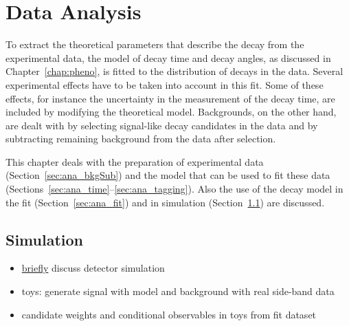 \chapter{Data Analysis}
\label{chap:ana}


To extract the theoretical parameters that describe the \BstoJpsiKK{} decay from the experimental data, the model of decay time and decay
angles, as discussed in Chapter~\ref{chap:pheno}, is fitted to the distribution of decays in the data. Several experimental effects have to
be taken into account in this fit. Some of these effects, for instance the uncertainty in the measurement of the decay time, are included
by modifying the theoretical model. Backgrounds, on the other hand, are dealt with by selecting signal-like decay candidates in the data
and by subtracting remaining background from the data after selection.

This chapter deals with the preparation of experimental data (Section~\ref{sec:ana_bkgSub}) and the model that can be used to fit these
data (Sections~\ref{sec:ana_time}--\ref{sec:ana_tagging}). Also the use of the decay model in the fit (Section~\ref{sec:ana_fit}) and in
simulation (Section~\ref{sec:ana_sim}) are discussed.








\section{Simulation}
\label{sec:ana_sim}
\begin{itemize}
  \item \underline{briefly} discuss detector simulation
  \item toys: generate signal with model and background with real side-band data
  \item candidate weights and conditional observables in toys from fit dataset
\end{itemize}
